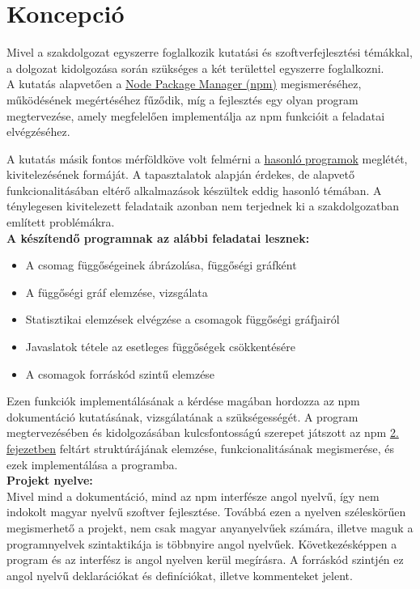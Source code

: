 
\section{Koncepció}

Mivel a szakdolgozat egyszerre foglalkozik kutatási és szoftverfejlesztési témákkal, a dolgozat kidolgozása során szükséges a két területtel egyszerre foglalkozni.\\ 

A kutatás alapvetően a \hyperlink{chapter.2}{Node Package Manager (npm)} megismeréséhez, működésének megértéséhez fűződik, míg a fejlesztés egy olyan program megtervezése, amely megfelelően implementálja az npm funkcióit a feladatai elvégzéséhez.

A kutatás másik fontos mérföldköve volt felmérni a \hyperlink{section.3.2}{hasonló programok} meglétét, kivitelezésének formáját. A tapasztalatok alapján érdekes, de alapvető funkcionalitásában eltérő alkalmazások készültek eddig hasonló témában. A ténylegesen kivitelezett feladataik azonban nem terjednek ki a szakdolgozatban említett problémákra.\\

\textbf{A készítendő programnak az alábbi feladatai lesznek:}
\begin{itemize}
	\item A csomag függőségeinek ábrázolása, függőségi gráfként
	\item A függőségi gráf elemzése, vizsgálata
	\item Statisztikai elemzések elvégzése a csomagok függőségi gráfjairól
	\item Javaslatok tétele az esetleges függőségek csökkentésére
	\item A csomagok forráskód szintű elemzése
\end{itemize}

Ezen funkciók implementálásának a kérdése magában hordozza az npm dokumentáció kutatásának, vizsgálatának a szükségességét.
A program megtervezésében és kidolgozásában kulcsfontosságú szerepet játszott az npm \hyperlink{chapter.2}{2. fejezetben} feltárt struktúrájának elemzése, funkcionalitásának megismerése, és ezek implementálása a programba.\\

\textbf{Projekt nyelve:}\\

Mivel mind a dokumentáció, mind az npm interfésze angol nyelvű, így nem indokolt magyar nyelvű szoftver fejlesztése. Továbbá ezen a nyelven széleskörűen megismerhető a projekt, nem csak magyar anyanyelvűek számára, illetve maguk a programnyelvek szintaktikája is többnyire angol nyelvűek. Következésképpen a program és az interfész is angol nyelven kerül megírásra. A forráskód szintjén ez angol nyelvű deklarációkat és definíciókat, illetve kommenteket jelent. 

